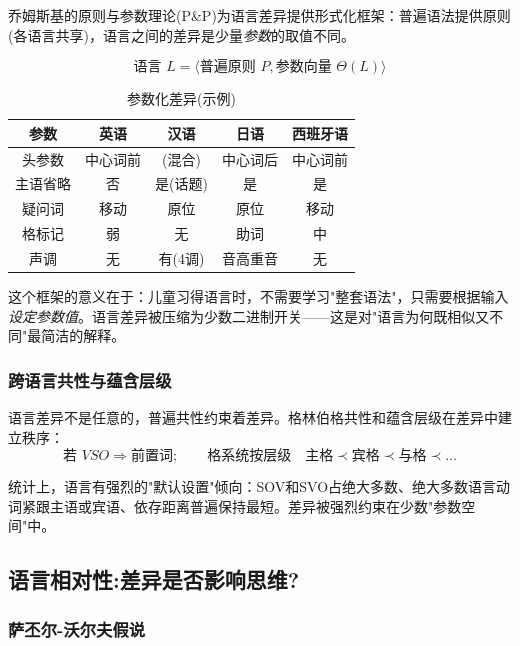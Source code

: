 乔姆斯基的原则与参数理论(P\&P)为语言差异提供形式化框架：普遍语法提供原则(各语言共享)，语言之间的差异是少量\emph{参数}的取值不同。

\begin{equation}
    \text{语言 } L = \langle \text{普遍原则 } P, \text{参数向量 } \Theta(L) \rangle
\end{equation}

\begin{table}[H]
\centering
\caption{参数化差异(示例)}
\begin{tabulary}{\textwidth}{@{}CCCCC@{}}
\toprule
\textbf{参数} & \textbf{英语} & \textbf{汉语} & \textbf{日语} & \textbf{西班牙语} \\
\midrule
头参数 & 中心词前 & (混合) & 中心词后 & 中心词前 \\
主语省略 & 否 & 是(话题) & 是 & 是 \\
疑问词 & 移动 & 原位 & 原位 & 移动 \\
格标记 & 弱 & 无 & 助词 & 中 \\
声调 & 无 & 有(4调) & 音高重音 & 无 \\
\bottomrule
\end{tabulary}
\end{table}

这个框架的意义在于：儿童习得语言时，不需要学习"整套语法"，只需要根据输入\emph{设定参数值}。语言差异被压缩为少数二进制开关——这是对"语言为何既相似又不同"最简洁的解释。

\subsubsection{跨语言共性与蕴含层级}

语言差异不是任意的，普遍共性约束着差异。格林伯格共性和蕴含层级在差异中建立秩序：
\begin{equation}
    \text{若 } VSO \Rightarrow \text{前置词}; \qquad \text{格系统按层级} \quad \text{主格} \prec \text{宾格} \prec \text{与格} \prec \ldots
\end{equation}

统计上，语言有强烈的"默认设置"倾向：SOV和SVO占绝大多数、绝大多数语言动词紧跟主语或宾语、依存距离普遍保持最短。差异被强烈约束在少数"参数空间"中。

\subsection{语言相对性:差异是否影响思维?}

\subsubsection{萨丕尔-沃尔夫假说}

